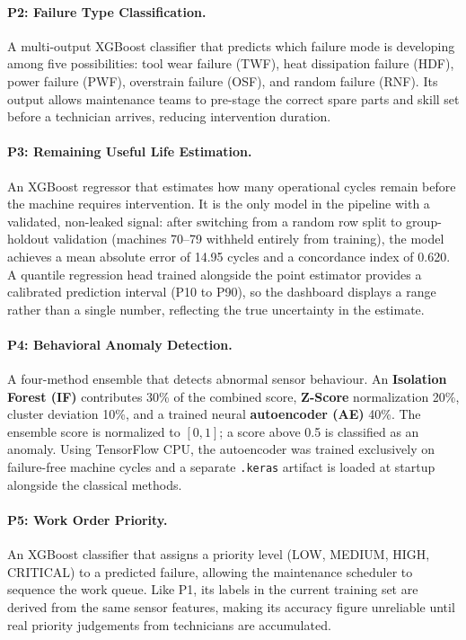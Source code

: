 \paragraph{P2: Failure Type Classification.}
A multi-output XGBoost classifier that predicts which failure mode is developing among five possibilities: tool wear failure (TWF), heat dissipation failure (HDF), power failure (PWF), overstrain failure (OSF), and random failure (RNF). Its output allows maintenance teams to pre-stage the correct spare parts and skill set before a technician arrives, reducing intervention duration.

\paragraph{P3: Remaining Useful Life Estimation.}
An XGBoost regressor that estimates how many operational cycles remain before the machine requires intervention. It is the only model in the pipeline with a validated, non-leaked signal: after switching from a random row split to group-holdout validation (machines 70--79 withheld entirely from training), the model achieves a mean absolute error of 14.95 cycles and a concordance index of 0.620. A quantile regression head trained alongside the point estimator provides a calibrated prediction interval (P10 to P90), so the dashboard displays a range rather than a single number, reflecting the true uncertainty in the estimate.

\paragraph{P4: Behavioral Anomaly Detection.}
A four-method ensemble that detects abnormal sensor behaviour. An \textbf{Isolation Forest (IF)} contributes 30\% of the combined score, \textbf{Z-Score} normalization 20\%, cluster deviation 10\%, and a trained neural \textbf{autoencoder (AE)} 40\%. The ensemble score is normalized to $[0,1]$; a score above 0.5 is classified as an anomaly. Using TensorFlow CPU, the autoencoder was trained exclusively on failure-free machine cycles and a separate \texttt{.keras} artifact is loaded at startup alongside the classical methods.

\paragraph{P5: Work Order Priority.}
An XGBoost classifier that assigns a priority level (LOW, MEDIUM, HIGH, CRITICAL) to a predicted failure, allowing the maintenance scheduler to sequence the work queue. Like P1, its labels in the current training set are derived from the same sensor features, making its accuracy figure unreliable until real priority judgements from technicians are accumulated.

